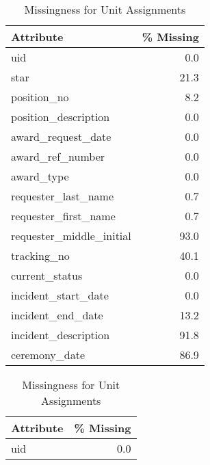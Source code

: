 \begin{table}
	\begin{minipage}[t]{0.48\textwidth}
		\centering
\end{minipage}\hfill
\begin{minipage}[t]{0.48\textwidth}
		\centering
\centering 
\end{minipage}
\end{table}

\begin{table}
\hfill\begin{minipage}[t]{0.48\textwidth}
\caption{Missingness for the Awards data file}
\centering 
\begin{tabular}{lr}
\toprule
               Attribute &  \% Missing \\
\midrule
                     uid &        0.0 \\
                    star &       21.3 \\
             position\_no &        8.2 \\
    position\_description &        0.0 \\
      award\_request\_date &        0.0 \\
        award\_ref\_number &        0.0 \\
              award\_type &        0.0 \\
     requester\_last\_name &        0.7 \\
    requester\_first\_name &        0.7 \\
requester\_middle\_initial &       93.0 \\
             tracking\_no &       40.1 \\
          current\_status &        0.0 \\
     incident\_start\_date &        0.0 \\
       incident\_end\_date &       13.2 \\
    incident\_description &       91.8 \\
           ceremony\_date &       86.9 \\
\bottomrule
\end{tabular}
\end{minipage}
\begin{minipage}[t]{0.48\textwidth}
\centering 
		\caption{Missingness for Unit Assignments}
\begin{tabular}{lr}
\toprule
 Attribute &  \% Missing \\
\midrule
       uid &        0.0 \\

\end{tabular}
\end{minipage}
\end{table}
